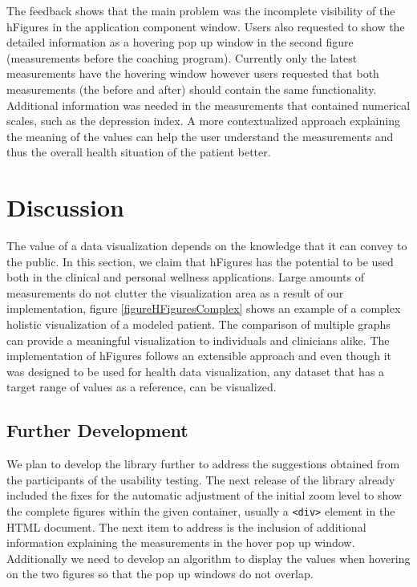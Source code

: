\documentclass[twocolumn]{bmcart}%
\begin{document}
The feedback shows that the main problem was the incomplete visibility of the hFigures in the application component window. Users also requested to show the detailed information as a hovering pop up window in the second figure (measurements before the coaching program). Currently only the latest measurements have the hovering window however users requested that both measurements (the before and after) should contain the same functionality. Additional information was needed in the measurements that contained numerical scales, such as the depression index. A more contextualized approach explaining the meaning of the values can help the user understand the measurements and thus the overall health situation of the patient better.

\section*{Discussion}

The value of a data visualization depends on the knowledge that it can convey to the public. In this section, we claim that hFigures has the potential to be used both in the clinical and personal wellness applications. Large amounts of measurements do not clutter the visualization area as a result of our implementation, figure \ref{figureHFiguresComplex} shows an example of a complex holistic visualization of a modeled patient. The comparison of multiple graphs can provide a meaningful visualization to individuals and clinicians alike. The implementation of hFigures follows an extensible approach and even though it was designed to be used for health data visualization, any dataset that has a target range of values as a reference, can be visualized.

\subsection*{Further Development}

We plan to develop the library further to address the suggestions obtained from the participants of the usability testing. The next release of the library already included the fixes for the automatic adjustment of the initial zoom level to show the complete figures within the given container, usually a \texttt{<div>} element in the HTML document. The next item to address is the inclusion of additional information explaining the measurements in the hover pop up window. Additionally we need to develop an algorithm to display the values when hovering on the two figures so that the pop up windows do not overlap.
\end{document}
